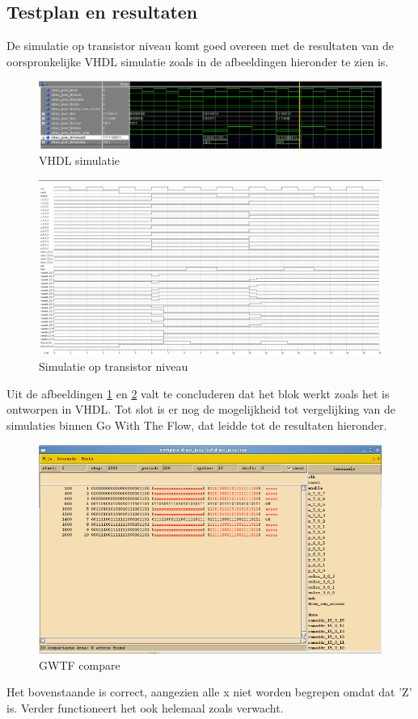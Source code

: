 \documentclass{scrreprt} %
\begin{document}
\subsection{Testplan en resultaten}
 De simulatie op transistor niveau komt goed overeen met de resultaten van de oorspronkelijke VHDL simulatie zoals in de afbeeldingen hieronder te zien is.
\begin{figure} [h!]
\includegraphics [width = \textwidth] {resource/dp_sim}
\caption{VHDL simulatie}
\label{fig:dpsim}
\end{figure}

\begin{figure} [h!]
\includegraphics [width = \textwidth] {resource/dp_sw_lev}
\caption{Simulatie op transistor niveau}
\label{fig:dpswitchl}
\end{figure}
Uit de afbeeldingen \ref{fig:dpsim} en \ref{fig:dpswitchl} valt te concluderen dat het blok werkt zoals het is ontworpen in VHDL. Tot slot is er nog de mogelijkheid tot vergelijking van de simulaties binnen Go With The Flow, dat leidde tot de resultaten hieronder.
\begin{figure} [h!]
\includegraphics [width = \textwidth] {resource/dp_comp}
\caption{GWTF compare}
\label{fig:dpcomp}
\end{figure}
Het bovenstaande is correct, aangezien alle x niet worden begrepen omdat dat 'Z' is. Verder functioneert het ook helemaal zoals verwacht.
\end{document}
